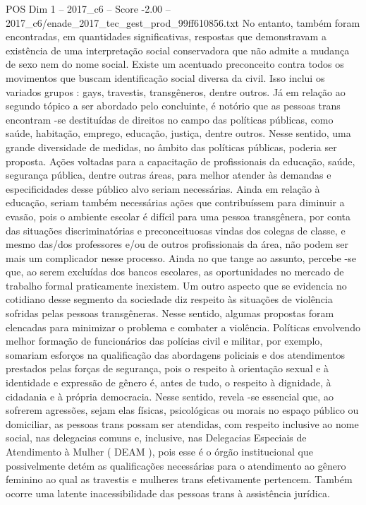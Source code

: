 \begin{textsample}{POS Dim 1 – 2017\_c6 – Score -2.00 – 2017\_c6/enade\_2017\_tec\_gest\_prod\_99ff610856.txt}
No entanto, também foram encontradas, em quantidades significativas, respostas que demonstravam a existência de uma interpretação social conservadora que não admite a mudança de sexo nem do nome social.
Existe um acentuado preconceito contra todos os movimentos que buscam identificação social diversa da civil.
Isso inclui os variados grupos : gays, travestis, transgêneros, dentre outros.
Já em relação ao segundo tópico a ser abordado pelo concluinte, é notório que as pessoas trans encontram -se destituídas de direitos no campo das políticas públicas, como saúde, habitação, emprego, educação, justiça, dentre outros.
Nesse sentido, uma grande diversidade de medidas, no âmbito das políticas públicas, poderia ser proposta.
Ações voltadas para a capacitação de profissionais da educação, saúde, segurança pública, dentre outras áreas, para melhor atender às demandas e especificidades desse público alvo seriam necessárias.
Ainda em relação à educação, seriam também necessárias ações que contribuíssem para diminuir a evasão, pois o ambiente escolar é difícil para uma pessoa transgênera, por conta das situações discriminatórias e preconceituosas vindas dos colegas de classe, e mesmo das/dos professores e/ou de outros profissionais da área, não podem ser mais um complicador nesse processo.
Ainda no que tange ao assunto, percebe -se que, ao serem excluídas dos bancos escolares, as oportunidades no mercado de trabalho formal praticamente inexistem.
Um outro aspecto que se evidencia no cotidiano desse segmento da sociedade diz respeito às situações de violência sofridas pelas pessoas transgêneras.
Nesse sentido, algumas propostas foram elencadas para minimizar o problema e combater a violência.
Políticas envolvendo melhor formação de funcionários das polícias civil e militar, por exemplo, somariam esforços na qualificação das abordagens policiais e dos atendimentos prestados pelas forças de segurança, pois o respeito à orientação sexual e à identidade e expressão de gênero é, antes de tudo, o respeito à dignidade, à cidadania e à própria democracia.
Nesse sentido, revela -se essencial que, ao sofrerem agressões, sejam elas físicas, psicológicas ou morais no espaço público ou domiciliar, as pessoas trans possam ser atendidas, com respeito inclusive ao nome social, nas delegacias comuns e, inclusive, nas Delegacias Especiais de Atendimento à Mulher ( DEAM ), pois esse é o órgão institucional que possivelmente detém as qualificações necessárias para o atendimento ao gênero feminino ao qual as travestis e mulheres trans efetivamente pertencem.
Também ocorre uma latente inacessibilidade das pessoas trans à assistência jurídica.

\end{textsample}
